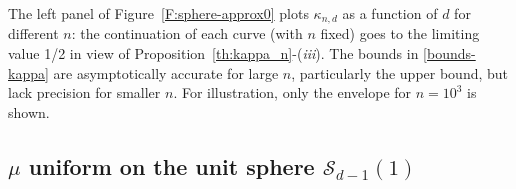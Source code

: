 \documentclass{article}
\newcommand{\AZ}{\textcolor{blue}}
\def\SS{{\mathcal S}}
\newcommand{\bea}{\begin{eqnarray*}}
\newcommand{\eea}{\end{eqnarray*}}
\newcommand{\be}{\begin{eqnarray}}
\newcommand{\ee}{\end{eqnarray}}
\def\dd{\mbox{\rm d}}
\newtheorem{remark}{Remark}[section]
\begin{document}
The left panel of Figure~\ref{F:sphere-approx0} plots $\kappa_{n,d}$ as a function of $d$ for different $n$: the continuation of each curve (with $n$ fixed) goes to the limiting value 1/2 in view of Proposition~\ref{th:kappa_n}-(\textit{iii}). The bounds in \eqref{bounds-kappa} are asymptotically accurate for large $n$, particularly the upper bound, but lack precision for smaller $n$. For illustration, only the envelope for $n = 10^3$ is shown.

\subsection{$\mu$ uniform on the unit sphere $\SS_{d-1}(1)$} \label{S:extreme-value-sphere}
\end{document}
